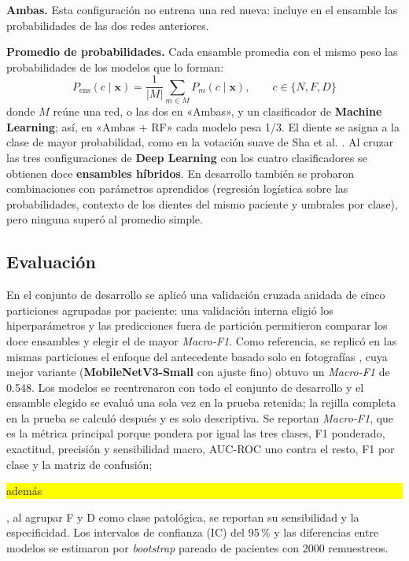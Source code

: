 \documentclass[runningheads]{llncs}
\newcommand{\sol}[1]{\textcolor{solucion}{\textbf{#1}}}
\newcommand{\con}[1]{{\setlength{\fboxsep}{0.5pt}\colorbox{yellow}{\strut #1}}}
\newcommand{\sol}[1]{#1}
\newcommand{\con}[1]{#1}
\begin{document}
\textbf{Ambas.} Esta configuración no entrena una red nueva: incluye en
el ensamble las probabilidades de las dos redes anteriores.

\textbf{Promedio de probabilidades.} Cada ensamble promedia con el mismo
peso las probabilidades de los modelos que lo forman:
\begin{equation}
P_{\mathrm{ens}}(c \mid \mathbf{x}) = \frac{1}{|M|} \sum_{m \in M}
P_m(c \mid \mathbf{x}), \qquad c \in \{N, F, D\}
\label{eq:ensamble}
\end{equation}
donde $M$ reúne una red, o las dos en «Ambas», y un clasificador de
\sol{Machine Learning}; así, en «Ambas + RF» cada modelo pesa 1/3. El
diente se asigna a la clase de mayor probabilidad, como en la votación
suave de Sha et al. \cite{sha2025radiomics}. Al cruzar las tres
configuraciones de \sol{Deep Learning} con los cuatro clasificadores se
obtienen doce \sol{ensambles híbridos}. En desarrollo también se probaron
combinaciones con parámetros aprendidos (regresión logística sobre las
probabilidades, contexto de los dientes del mismo paciente y umbrales por
clase), pero ninguna superó al promedio simple.

\subsection{Evaluación}
En el conjunto de desarrollo se aplicó una validación cruzada anidada de
cinco particiones agrupadas por paciente: una validación interna eligió
los hiperparámetros y las predicciones fuera de partición permitieron
comparar los doce ensambles y elegir el de mayor \textit{Macro-F1}. Como
referencia, se replicó en las mismas particiones el enfoque del
antecedente basado solo en fotografías \cite{liu2025fdtooth}, cuya mejor
variante (\sol{MobileNetV3-Small} con ajuste fino) obtuvo un
\textit{Macro-F1} de 0.548. Los modelos se reentrenaron con todo el
conjunto de desarrollo y el ensamble elegido se evaluó una sola vez en la
prueba retenida; la rejilla completa en la prueba se calculó después y es
solo descriptiva. Se reportan \textit{Macro-F1}, que es la métrica
principal porque pondera por igual las tres clases, F1 ponderado,
exactitud, precisión y sensibilidad macro, AUC-ROC uno contra el resto, F1
por clase y la matriz de confusión; \con{además}, al agrupar F y D como
clase patológica, se reportan su sensibilidad y la especificidad. Los
intervalos de confianza (IC) del 95\,\% y las diferencias entre modelos se
estimaron por \textit{bootstrap} pareado de pacientes con 2000
remuestreos.
\end{document}
